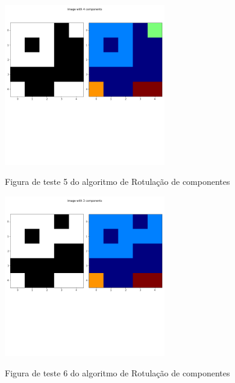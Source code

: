 \documentclass{article}
\begin{document}
\begin{figure}[!ht]
	\begin{minipage}[b]{1.0\linewidth}
		\centering
		\centerline{\includegraphics[width=7cm]{Figures/test5.png}}
		\label{fig: test5}
		\vspace{-2.0cm}
		\centerline{Figura de teste 5 do algoritmo de Rotulação de componentes}\medskip	
	\end{minipage}
\end{figure}

\begin{figure}[!ht]
	
	\begin{minipage}[b]{1.0\linewidth}
		\centering
		\centerline{\includegraphics[width=7cm]{Figures/test6.png}}
		\label{fig: test6}
		\vspace{-2.0cm}
		\centerline{Figura de teste 6 do algoritmo de Rotulação de componentes}\medskip	
	\end{minipage}
\end{figure}
\end{document}
